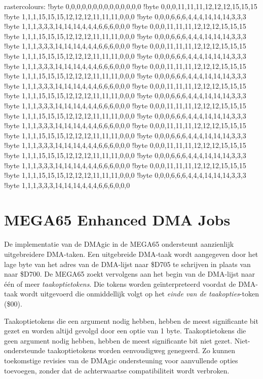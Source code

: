 \begin{asmcodesmall}
rastercolours:
  !byte 0,0,0,0,0,0,0,0,0,0,0,0,0,0
  !byte 0,0,0,11,11,11,12,12,12,15,15,15
  !byte 1,1,1,15,15,15,12,12,12,11,11,11,0,0,0
  !byte 0,0,0,6,6,6,4,4,4,14,14,14,3,3,3
  !byte 1,1,1,3,3,3,14,14,14,4,4,4,6,6,6,0,0,0
  !byte 0,0,0,11,11,11,12,12,12,15,15,15
  !byte 1,1,1,15,15,15,12,12,12,11,11,11,0,0,0
  !byte 0,0,0,6,6,6,4,4,4,14,14,14,3,3,3
  !byte 1,1,1,3,3,3,14,14,14,4,4,4,6,6,6,0,0,0
  !byte 0,0,0,11,11,11,12,12,12,15,15,15
  !byte 1,1,1,15,15,15,12,12,12,11,11,11,0,0,0
  !byte 0,0,0,6,6,6,4,4,4,14,14,14,3,3,3
  !byte 1,1,1,3,3,3,14,14,14,4,4,4,6,6,6,0,0,0
  !byte 0,0,0,11,11,11,12,12,12,15,15,15
  !byte 1,1,1,15,15,15,12,12,12,11,11,11,0,0,0
  !byte 0,0,0,6,6,6,4,4,4,14,14,14,3,3,3
  !byte 1,1,1,3,3,3,14,14,14,4,4,4,6,6,6,0,0,0
  !byte 0,0,0,11,11,11,12,12,12,15,15,15
  !byte 1,1,1,15,15,15,12,12,12,11,11,11,0,0,0
  !byte 0,0,0,6,6,6,4,4,4,14,14,14,3,3,3
  !byte 1,1,1,3,3,3,14,14,14,4,4,4,6,6,6,0,0,0
  !byte 0,0,0,11,11,11,12,12,12,15,15,15
  !byte 1,1,1,15,15,15,12,12,12,11,11,11,0,0,0
  !byte 0,0,0,6,6,6,4,4,4,14,14,14,3,3,3
  !byte 1,1,1,3,3,3,14,14,14,4,4,4,6,6,6,0,0,0
  !byte 0,0,0,11,11,11,12,12,12,15,15,15
  !byte 1,1,1,15,15,15,12,12,12,11,11,11,0,0,0
  !byte 0,0,0,6,6,6,4,4,4,14,14,14,3,3,3
  !byte 1,1,1,3,3,3,14,14,14,4,4,4,6,6,6,0,0,0
  !byte 0,0,0,11,11,11,12,12,12,15,15,15
  !byte 1,1,1,15,15,15,12,12,12,11,11,11,0,0,0
  !byte 0,0,0,6,6,6,4,4,4,14,14,14,3,3,3
  !byte 1,1,1,3,3,3,14,14,14,4,4,4,6,6,6,0,0,0
  !byte 0,0,0,11,11,11,12,12,12,15,15,15
  !byte 1,1,1,15,15,15,12,12,12,11,11,11,0,0,0
  !byte 0,0,0,6,6,6,4,4,4,14,14,14,3,3,3
  !byte 1,1,1,3,3,3,14,14,14,4,4,4,6,6,6,0,0,0
\end{asmcodesmall}

\section{MEGA65 Enhanced DMA Jobs}

De implementatie van de DMAgic in de MEGA65 ondersteunt aanzienlijk uitgebreidere DMA-taken. Een uitgebreide DMA-taak wordt aangegeven door het lage byte van het adres van de DMA-lijst naar \$D705 te schrijven in plaats van naar \$D700. De MEGA65 zoekt vervolgens aan het begin van de DMA-lijst naar één of meer {\em taakoptietokens}. Die tokens worden geïnterpreteerd voordat de DMA-taak wordt uitgevoerd die onmiddellijk volgt op het {\em einde van de taakopties}-token (\$00).

Taakoptietokens die een argument nodig hebben, hebben de meest significante bit gezet en worden altijd gevolgd door een optie van 1 byte. Taakoptietokens die geen argument nodig hebben, hebben de meest significante bit niet gezet. Niet-ondersteunde taakoptietokens worden eenvoudigweg genegeerd. Zo kunnen toekomstige revisies van de DMAgic ondersteuning voor aanvullende opties toevoegen, zonder dat de achterwaartse compatibiliteit wordt verbroken.

